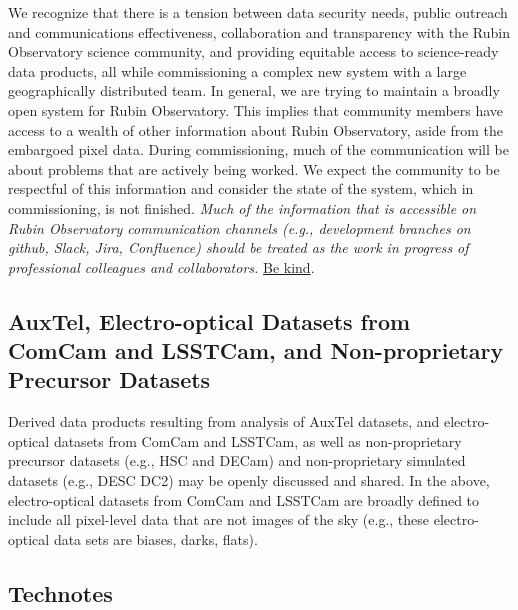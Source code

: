 \documentclass[SE,authoryear,toc]{lsstdoc}
\begin{document}

\begin{note}[Be Kind]
We recognize that there is a tension between data security needs, public outreach and communications effectiveness, collaboration and transparency with the Rubin Observatory science community, and providing equitable access to science-ready data products, all while commissioning a complex new system with a large geographically distributed team.
In general, we are trying to maintain a broadly open system for Rubin Observatory.
This implies that community members have access to a wealth of other information about Rubin Observatory, aside from the embargoed pixel data.
During commissioning, much of the communication will be about problems that are actively being worked.
We expect the community to be respectful of this information and consider the state of the system, which in commissioning, is not finished.
\textit{Much of the information that is accessible on Rubin Observatory communication channels (e.g., development branches on github, Slack, Jira, Confluence) should be treated as the work in progress of professional colleagues and collaborators.}
\href{https://www.lsst.org/about/dei/kindness}{Be kind}.
\end{note}

\subsection{AuxTel, Electro-optical Datasets from ComCam and LSSTCam, and Non-proprietary Precursor Datasets}

Derived data products resulting from analysis of AuxTel datasets, and electro-optical datasets from ComCam and LSSTCam, as well as non-proprietary precursor datasets (e.g., HSC and DECam) and non-proprietary simulated datasets (e.g., DESC DC2) may be openly discussed and shared.
In the above, electro-optical datasets from ComCam and LSSTCam are broadly defined to include all pixel-level data that are not images of the sky (e.g., these electro-optical data sets are biases, darks, flats).

\subsection{Technotes}
\label{technotes}
\end{document}

